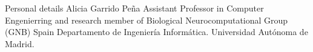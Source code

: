 \begin{rubric}{Personal details}
Alicia Garrido Peña
Assistant Professor in Computer Engenierring and research member of Biological Neurocomputational Group (GNB)
Spain
Departamento de Ingeniería Informática. Universidad Autónoma de Madrid.

\end{rubric}